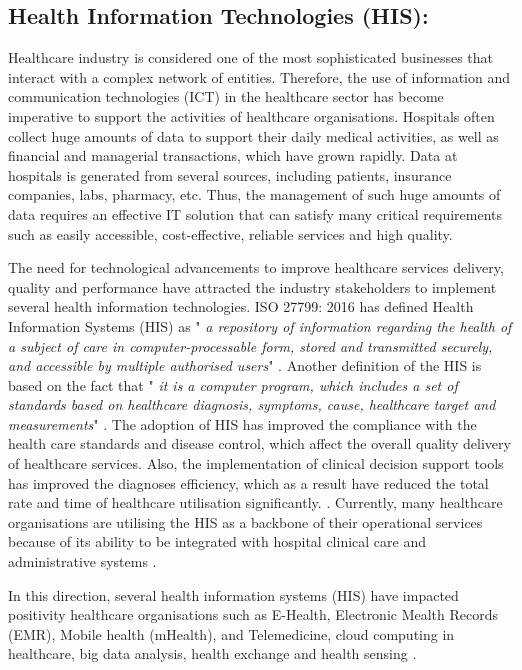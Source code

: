 \subsection{Health Information Technologies (HIS):}

Healthcare industry is considered one of the most sophisticated businesses that interact with a complex network of entities. Therefore, the use of information and communication technologies (ICT) in the healthcare sector has become imperative to support the activities of healthcare organisations. Hospitals often collect huge amounts of data to support their daily medical activities, as well as financial and managerial transactions, which have grown rapidly. Data at hospitals is generated from several sources, including patients, insurance companies, labs, pharmacy, etc. Thus, the management of such huge amounts of data requires an effective IT solution that can satisfy many critical requirements such as easily accessible, cost-effective, reliable services and high quality.


The need for technological advancements to improve healthcare services delivery, quality and performance have attracted the industry stakeholders to implement several health information technologies. ISO 27799: 2016 has defined Health Information Systems (HIS) as " \textit{a repository of information regarding the health of a subject of care in computer-processable form, stored and transmitted securely, and accessible by multiple authorised users}"  \cite{TheInternationalOrganizationforStandardization2016}. Another definition of the HIS is based on the fact that " \textit{it is a computer program, which includes a set of standards based on healthcare diagnosis, symptoms, cause, healthcare target and measurements}"  \cite{Pai2011}. The adoption of HIS has improved the compliance with the health care standards and disease control, which affect the overall quality delivery of healthcare services. Also, the implementation of clinical decision support tools has improved the diagnoses efficiency, which as a result have reduced the total rate and time of healthcare utilisation significantly. \cite{Care2006,Akowuah2013}. Currently, many healthcare organisations are utilising the HIS as a backbone of their operational services because of its ability to be integrated with hospital clinical care and administrative systems \cite{Rahim2016}.   

In this direction, several health information systems (HIS) have impacted positivity healthcare organisations such as E-Health, Electronic Mealth Records (EMR), Mobile health (mHealth),
and Telemedicine, cloud computing in healthcare, 
big data analysis,
health exchange and health sensing  \cite{WorldHealthOrganization2016,Yang2015}. 


